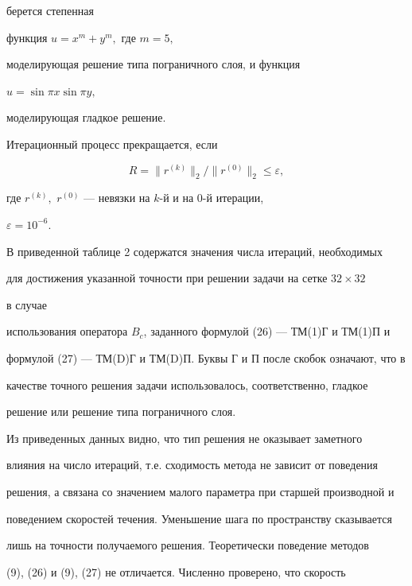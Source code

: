 берется степенная 


функция $u=x^m + y^m,$ где $m=5,$ 


моделирующая решение типа пограничного слоя, и функция \linebreak




$u=\sin \pi x \sin \pi y,$ 


моделирующая гладкое решение. 


 


Итерационный процесс прекращается, если 


$$ 


R=\|r^{(k)}\|_2 / \|r^{(0)}\|_2 \le \varepsilon, 


$$ 


где $r^{(k)},$ $r^{(0)}$ --- невязки на $k$-й и на 0-й итерации, 


$\varepsilon=10^{-6}.$ 


 


В приведенной таблице 2 содержатся значения числа итераций, необходимых 


для достижения указанной точности при решении задачи на сетке $32\times 32$ 


в случае 


использования оператора $B_c$, заданного формулой (26) --- ТМ(1)Г и ТМ(1)П и 


формулой (27) --- ТМ(D)Г и ТМ(D)П. Буквы Г и П после скобок означают, что в 


качестве точного решения задачи использовалось, соответственно, гладкое 


решение или решение типа пограничного слоя. 


 


Из приведенных данных видно, что тип решения не оказывает заметного 


влияния на число итераций, т.е. сходимость метода не зависит от поведения 


решения, а связана со значением малого параметра при старшей производной и 


поведением скоростей течения. Уменьшение шага по пространству сказывается


лишь на точности получаемого решения. Теоретически поведение методов 


(9), (26) и (9), (27) не отличается. Численно проверено, что скорость 


